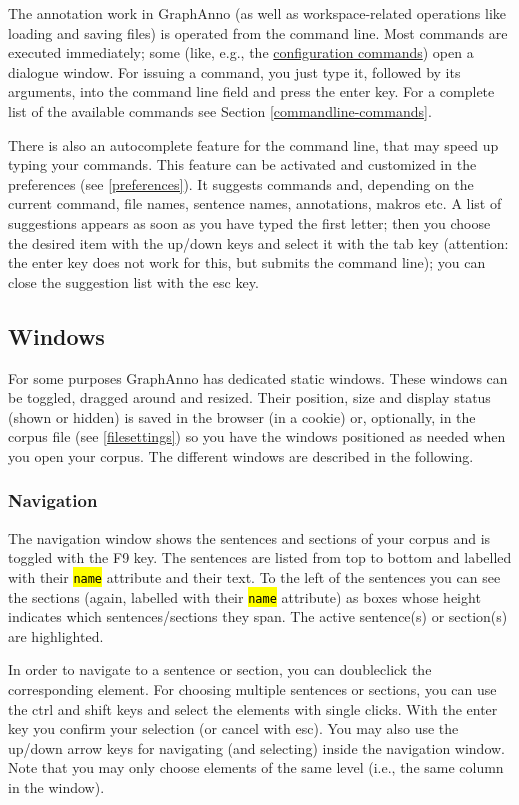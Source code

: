 \documentclass[12pt]{scrartcl}
\newcommand{\code}[1]{\hl{\texttt{#1}}}
\begin{document}
The annotation work in GraphAnno (as well as workspace-related operations like loading and saving files) is operated from the command line.
Most commands are executed immediately; some (like, e.g., the \hyperref[konfiguration]{configuration commands}) open a dialogue window.
For issuing a command, you just type it, followed by its arguments, into the command line field and press the enter key.
For a complete list of the available commands see Section \ref{commandline-commands}.

There is also an autocomplete feature for the command line, that may speed up typing your commands.
This feature can be activated and customized in the preferences (see \ref{preferences}).
It suggests commands and, depending on the current command, file names, sentence names, annotations, makros etc.
A list of suggestions appears as soon as you have typed the first letter; then you choose the desired item with the up/down keys and select it with the tab key (attention: the enter key does not work for this, but submits the command line); you can close the suggestion list with the esc key.


\subsection{Windows}\label{windows}

For some purposes GraphAnno has dedicated static windows.
These windows can be toggled, dragged around and resized.
Their position, size and display status (shown or hidden) is saved in the browser (in a cookie) or, optionally, in the corpus file (see \ref{filesettings}) so you have the windows positioned as needed when you open your corpus.
The different windows are described in the following.

\subsubsection{Navigation}\label{window-navigation}

The navigation window shows the sentences and sections of your corpus and is toggled with the F9 key.
The sentences are listed from top to bottom and labelled with their \code{name} attribute and their text.
To the left of the sentences you can see the sections (again, labelled with their \code{name} attribute) as boxes whose height indicates which sentences/sections they span.
The active sentence(s) or section(s) are highlighted.

In order to navigate to a sentence or section, you can doubleclick the corresponding element.
For choosing multiple sentences or sections, you can use the ctrl and shift keys and select the elements with single clicks.
With the enter key you confirm your selection (or cancel with esc).
You may also use the up/down arrow keys for navigating (and selecting) inside the navigation window.
Note that you may only choose elements of the same level (i.e., the same column in the window).
\end{document}
